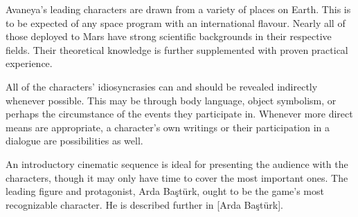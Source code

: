 

Avaneya's leading characters are drawn from a variety of places on Earth. This is to be expected of any space program with an international flavour. Nearly all of those deployed to Mars have strong scientific backgrounds in their respective fields. Their theoretical knowledge is further supplemented with proven practical experience.

All of the characters' idiosyncrasies can and should be revealed indirectly whenever possible. This may be through body language, object symbolism, or perhaps the circumstance of the events they participate in. Whenever more direct means are appropriate, a character's own writings or their participation in a dialogue are possibilities as well.

An introductory cinematic sequence is ideal for presenting the audience with the characters, though it may only have time to cover the most important ones. The leading figure and protagonist, Arda Baştürk, ought to be the game's most recognizable character. He is described further in [Arda Baştürk].

\page


\page


\page


\page


\page


\page


\StopChapter


